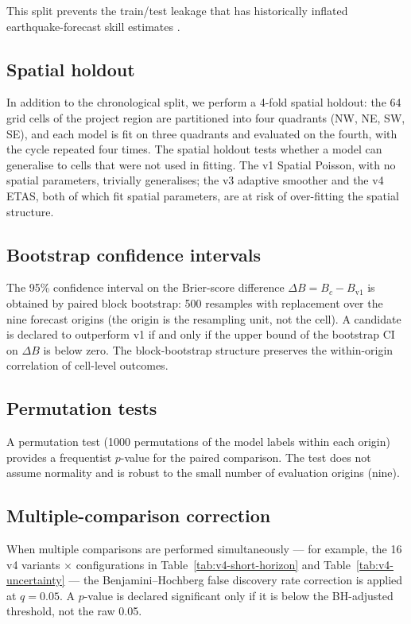 \documentclass[10pt,a4paper,twocolumn]{article}
\begin{document}
This split prevents the train/test leakage that has historically inflated earthquake-forecast skill estimates \cite{marzocchi2012}.

\subsection{Spatial holdout}

In addition to the chronological split, we perform a 4-fold spatial holdout: the 64 grid cells of the project region are partitioned into four quadrants (NW, NE, SW, SE), and each model is fit on three quadrants and evaluated on the fourth, with the cycle repeated four times. The spatial holdout tests whether a model can generalise to cells that were not used in fitting. The v1 Spatial Poisson, with no spatial parameters, trivially generalises; the v3 adaptive smoother and the v4 ETAS, both of which fit spatial parameters, are at risk of over-fitting the spatial structure.

\subsection{Bootstrap confidence intervals}

The 95\% confidence interval on the Brier-score difference $\Delta B = B_c - B_{\text{v1}}$ is obtained by paired block bootstrap: 500 resamples with replacement over the nine forecast origins (the origin is the resampling unit, not the cell). A candidate is declared to outperform v1 if and only if the upper bound of the bootstrap CI on $\Delta B$ is below zero. The block-bootstrap structure preserves the within-origin correlation of cell-level outcomes.

\subsection{Permutation tests}

A permutation test (1000 permutations of the model labels within each origin) provides a frequentist $p$-value for the paired comparison. The test does not assume normality and is robust to the small number of evaluation origins (nine).

\subsection{Multiple-comparison correction}

When multiple comparisons are performed simultaneously --- for example, the 16 v4 variants $\times$ configurations in Table~\ref{tab:v4-short-horizon} and Table~\ref{tab:v4-uncertainty} --- the Benjamini--Hochberg false discovery rate correction \cite{benjamini1995} is applied at $q=0.05$. A $p$-value is declared significant only if it is below the BH-adjusted threshold, not the raw 0.05.
\end{document}
